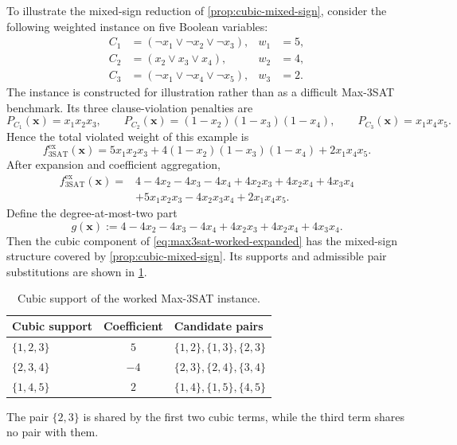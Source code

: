 \documentclass[a4paper,onecolumn,11pt,unpublished]{quantumarticle}
\theoremstyle{remark}
\begin{document}
To illustrate the mixed-sign reduction of \cref{prop:cubic-mixed-sign}, consider
the following weighted instance on five
Boolean variables:
\begin{equation}
    \begin{aligned}
        C_1&=(\neg x_1\lor\neg x_2\lor\neg x_3), & w_1&=5,\\
        C_2&=(x_2\lor x_3\lor x_4),              & w_2&=4,\\
        C_3&=(\neg x_1\lor\neg x_4\lor\neg x_5), & w_3&=2.
    \end{aligned}
    \label{eq:max3sat-worked-clauses}
\end{equation}
The instance is constructed for illustration rather than as a difficult
Max-3SAT benchmark. Its three clause-violation penalties are
\begin{equation}
    P_{C_1}(\bm x)=x_1x_2x_3,\qquad
    P_{C_2}(\bm x)=(1-x_2)(1-x_3)(1-x_4),\qquad
    P_{C_3}(\bm x)=x_1x_4x_5.
    \label{eq:max3sat-worked-clause-penalties}
\end{equation}
Hence the total violated weight of this example is
\begin{equation}
    f_{\mathrm{3SAT}}^{\mathrm{ex}}(\bm x)
    =5x_1x_2x_3
     +4(1-x_2)(1-x_3)(1-x_4)
     +2x_1x_4x_5.
    \label{eq:max3sat-worked-objective}
\end{equation}
After expansion and coefficient aggregation,
\begin{align}
    f_{\mathrm{3SAT}}^{\mathrm{ex}}(\bm x)
    ={}&4-4x_2-4x_3-4x_4
       +4x_2x_3+4x_2x_4+4x_3x_4 \nonumber\\
      &+5x_1x_2x_3-4x_2x_3x_4+2x_1x_4x_5.
    \label{eq:max3sat-worked-expanded}
\end{align}
Define the degree-at-most-two part
\begin{equation}
    g(\bm x)
    :=4-4x_2-4x_3-4x_4
      +4x_2x_3+4x_2x_4+4x_3x_4.
    \label{eq:max3sat-worked-lower}
\end{equation}
Then the cubic component of \cref{eq:max3sat-worked-expanded} has the
mixed-sign structure covered by \cref{prop:cubic-mixed-sign}. Its supports and
admissible pair substitutions are shown in
\cref{tab:max3sat-worked-support}.
\begin{table}[t]
    \centering
    \caption{Cubic support of the worked Max-3SAT instance.}
    \label{tab:max3sat-worked-support}
    \begin{tabular}{@{}lcl@{}}
        \toprule
        Cubic support & Coefficient & Candidate pairs\\
        \midrule
        $\{1,2,3\}$ & $5$  & $\{1,2\},\{1,3\},\{2,3\}$\\
        $\{2,3,4\}$ & $-4$ & $\{2,3\},\{2,4\},\{3,4\}$\\
        $\{1,4,5\}$ & $2$  & $\{1,4\},\{1,5\},\{4,5\}$\\
        \bottomrule
    \end{tabular}
\end{table}
The pair $\{2,3\}$ is shared by the first two cubic terms, while the third
term shares no pair with them.
\end{document}
